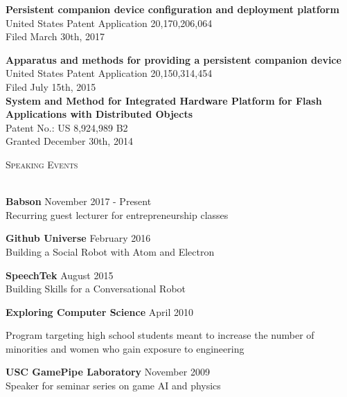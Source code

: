 \documentclass[a4paper]{article}
\newcommand{\lineunder} {
    \vspace*{-8pt} \\
    \hspace*{-18pt} \hrulefill \\
}
\newcommand{\header} [1] {
    {\hspace*{-18pt}\vspace*{6pt} \textsc{#1}}
    \vspace*{-6pt} \lineunder
    \vspace{2mm}
}
\begin{document}
\textbf{Persistent companion device configuration and deployment platform}\\
United States Patent Application 20,170,206,064\\
Filed March 30th, 2017
\vspace*{2mm}

\textbf{Apparatus and methods for providing a persistent companion device}\\
United States Patent Application 20,150,314,454\\
Filed July 15th, 2015\\

\vspace*{2mm}
\textbf{System and Method for Integrated Hardware Platform for Flash Applications
with Distributed Objects}\\
Patent No.: US 8,924,989 B2\\
Granted December 30th, 2014 \\
\vspace*{4mm}

\pagebreak[3]

\header{\faCommentingO \hspace{1pt} Speaking Events}
\textbf{Babson} \hfill November 2017 - Present\\
Recurring guest lecturer for entrepreneurship classes 
\vspace*{2mm}

\textbf{Github Universe} \hfill February 2016\\
Building a Social Robot with Atom and Electron 
\vspace*{2mm}

\textbf{SpeechTek} \hfill August 2015\\
Building Skills for a Conversational Robot
\vspace*{2mm}

\pagebreak[3]

\textbf{Exploring Computer Science} \hfill April 2010\\
\begin{addmargin}[0em]{4em}
Program targeting high school students meant to increase the number of
minorities and women who gain exposure to engineering
\end{addmargin}
\vspace*{2mm}

\textbf{USC GamePipe Laboratory} \hfill November 2009\\
Speaker for seminar series on game AI and physics 
\vspace*{4mm}
\end{document}
